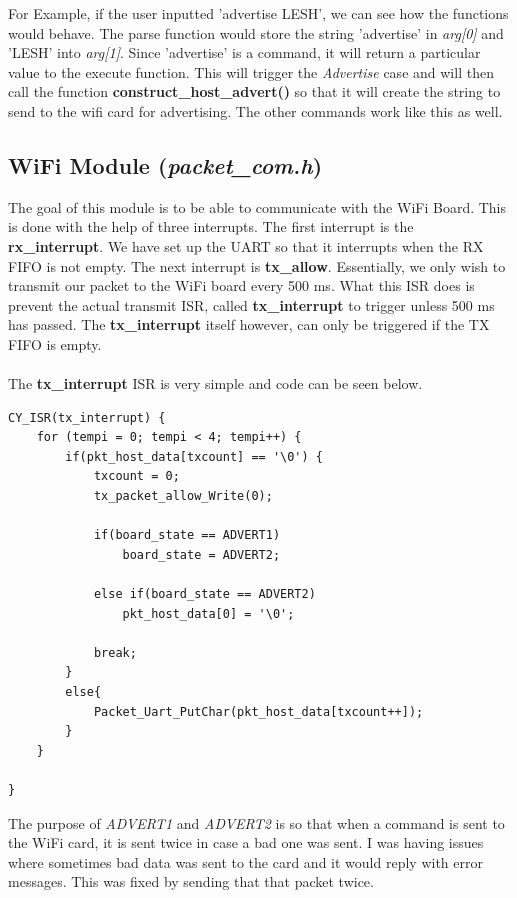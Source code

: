 \documentclass[a4paper, 12pt]{article}
\begin{document}
    For Example, if the user inputted 'advertise LESH', we can see how the 
    functions would behave. The parse function would store the string 
    'advertise' in \textit{arg[0]} and 'LESH' into \textit{arg[1]}. Since
    'advertise' is a command, it will return a particular value to the execute
    function. This will trigger the \textit{Advertise} case and will then
    call the function \textbf{construct\_host\_advert()} so that it will
    create the string to send to the wifi card for advertising. The other
    commands  work like this as well.

    


    
    \subsection{WiFi Module (\textit{packet\_com.h})}

    The goal of this module is to be able to communicate with the WiFi Board.
    This is done with the help of three interrupts. The first interrupt is the
    \textbf{rx\_interrupt}. We have set up the UART so that it interrupts when
    the RX FIFO is not empty. The next interrupt is \textbf{tx\_allow}. Essentially,
    we only wish to transmit our packet to the WiFi board every 500 ms. What this
    ISR does is prevent the actual transmit ISR, called \textbf{tx\_interrupt}
    to trigger unless 500 ms has passed. The \textbf{tx\_interrupt} itself
    however, can only be triggered if the TX FIFO is empty.
    \\ \\
    The \textbf{tx\_interrupt} ISR is very simple and code can be seen below.

    \begin{verbatim}
CY_ISR(tx_interrupt) {
    for (tempi = 0; tempi < 4; tempi++) {
        if(pkt_host_data[txcount] == '\0') {
            txcount = 0;
            tx_packet_allow_Write(0);
            
            if(board_state == ADVERT1)
                board_state = ADVERT2;
            
            else if(board_state == ADVERT2)
                pkt_host_data[0] = '\0';
            
            break;
        }
        else{
            Packet_Uart_PutChar(pkt_host_data[txcount++]);
        } 
    }
    
}
    \end{verbatim}

    The purpose of \textit{ADVERT1} and \textit{ADVERT2} is so that when a
    command is sent to the WiFi card, it is sent twice in case a bad one was
    sent. I was having issues where sometimes bad data was sent to the card
    and it would reply with error messages. This was fixed by sending that
    that packet twice.
    \\ \\
\end{document}
